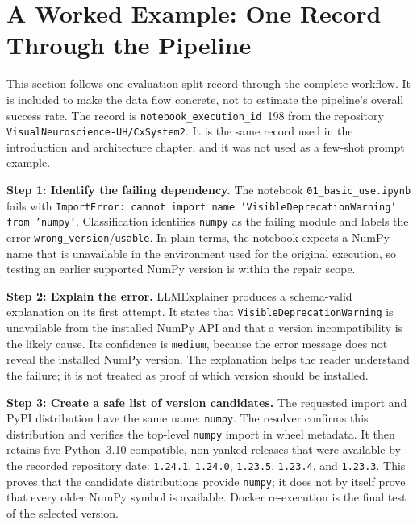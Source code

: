 \section{A Worked Example: One Record Through the Pipeline}
\label{sec:m-worked-example}

This section follows one evaluation-split record through the complete
workflow. It is included to make the data flow concrete, not to estimate the
pipeline's overall success rate. The record is
\texttt{notebook\_execution\_id}~198 from the repository
\texttt{VisualNeuroscience-UH/CxSystem2}. It is the same record used in the
introduction and architecture chapter, and it was not used as a few-shot
prompt example.

\noindent\begin{minipage}{\textwidth}
\medskip
\noindent\textbf{Step 1: Identify the failing dependency.}
The notebook \texttt{01\_basic\_use.ipynb}
fails with \texttt{ImportError: cannot import name
'VisibleDeprecationWarning' from 'numpy'}. Classification identifies
\texttt{numpy} as the failing module and labels the error
\texttt{wrong\_version}/\texttt{usable}. In plain terms, the notebook expects
a NumPy name that is unavailable in the environment used for the original
execution, so testing an earlier supported NumPy version is within the repair
scope.
\end{minipage}

\medskip
\noindent\textbf{Step 2: Explain the error.}
LLMExplainer produces a schema-valid explanation on its first attempt. It
states that \texttt{VisibleDeprecationWarning} is unavailable from the
installed NumPy API and that a version incompatibility is the likely cause.
Its confidence is \texttt{medium}, because the error message does not reveal
the installed NumPy version. The explanation helps the reader understand the
failure; it is not treated as proof of which version should be installed.

\medskip
\noindent\textbf{Step 3: Create a safe list of version candidates.}
The requested import and PyPI distribution have the same name:
\texttt{numpy}. The resolver confirms this distribution and verifies the
top-level \texttt{numpy} import in wheel metadata. It then retains five
Python~3.10-compatible, non-yanked releases that were available by the
recorded repository date: \texttt{1.24.1}, \texttt{1.24.0},
\texttt{1.23.5}, \texttt{1.23.4}, and \texttt{1.23.3}. This proves that the
candidate distributions provide \texttt{numpy}; it does not by itself prove
that every older NumPy symbol is available. Docker re-execution is the final
test of the selected version.


